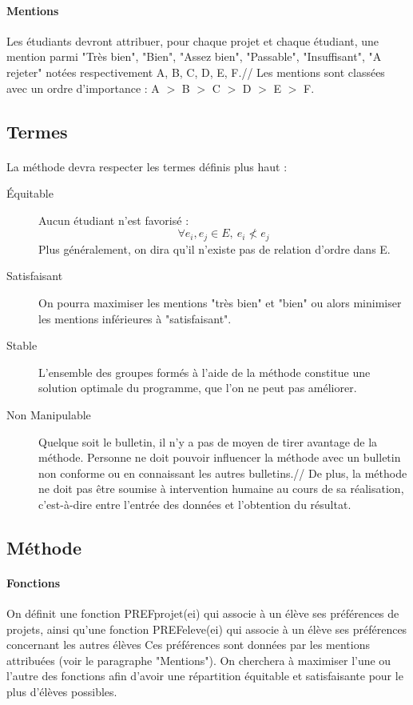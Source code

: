\documentclass[10pt,a4paper]{article}
\begin{document}
\paragraph{Mentions} Les étudiants devront attribuer, pour chaque projet et chaque étudiant, une mention parmi "Très bien", "Bien", "Assez bien", "Passable", "Insuffisant", "A rejeter" notées respectivement A, B, C, D, E, F.//
Les mentions sont classées avec un ordre d'importance : A $>$ B $>$ C $>$ D $>$ E $>$ F.

\subsection{Termes}
\paragraph{}
La méthode devra respecter les termes définis plus haut :
\begin{description}
\item[Équitable]
Aucun étudiant n'est favorisé : 
$$\forall e_{i},e_{j} \in E,\ e_{i} \nless e_{j}$$
Plus généralement, on dira qu'il n'existe pas de relation d'ordre dans E.
\item[Satisfaisant]
On pourra maximiser les mentions "très bien" et "bien" ou alors minimiser les mentions inférieures à "satisfaisant".
\item[Stable]
L'ensemble des groupes formés à l'aide de la méthode constitue une solution optimale du programme, que l'on ne peut pas améliorer.
\item[Non Manipulable]
Quelque soit le bulletin, il n'y a pas de moyen de tirer avantage de la méthode. Personne ne doit pouvoir influencer la méthode avec un bulletin non conforme ou en connaissant les autres bulletins.//
De plus, la méthode ne doit pas être soumise à intervention humaine au cours de sa réalisation, c'est-à-dire entre l'entrée des données et l'obtention du résultat.
\end{description}

\subsection{Méthode}
\paragraph{Fonctions}
On définit une fonction PREFprojet(ei) qui associe à un élève ses préférences de projets, ainsi qu'une fonction PREFeleve(ei) qui associe à un élève ses préférences concernant les autres élèves
Ces préférences sont données par les mentions attribuées (voir le paragraphe "Mentions").
On cherchera à maximiser l'une ou l'autre des fonctions afin d'avoir une répartition équitable et satisfaisante pour le plus d'élèves possibles.
\end{document}
